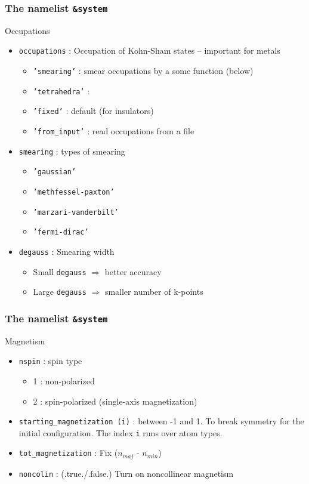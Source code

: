 \documentclass[]{beamer}
\def\t#1{{\texttt{#1}}}
\begin{document}
\begin{frame}
  \frametitle{The namelist \t{\&system}}
  \begin{block}{Occupations}
    \begin{itemize}
    \item<1-> \t{occupations} : Occupation of Kohn-Sham states -- important
    for metals
      \begin{itemize}
        \item[]\t{'smearing'} : smear occupations by a some function (below)
        \item[]\t{'tetrahedra'} : 
        \item[]\t{'fixed'} : default (for insulators)
        \item[]\t{'from\_input'} : read occupations from a file
      \end{itemize}
    \item<2-> \t{smearing} : types of smearing
      \begin{itemize}
      \item[]\t{'gaussian'}
      \item[]\t{'methfessel-paxton'} 
      \item[]\t{'marzari-vanderbilt'}
      \item[]\t{'fermi-dirac'}
      \end{itemize}
    \item<3-> \t{degauss} : Smearing width 
      \begin{itemize}
      \item[] Small \t{degauss} $\Rightarrow$ better accuracy
      \item[] Large \t{degauss} $\Rightarrow$ smaller number of k-points
      \end{itemize}
    \end{itemize}
  \end{block}
\end{frame}

\begin{frame}
  \frametitle{The namelist \t{\&system}}
  \begin{block}{Magnetism}
    \begin{itemize}
      \item<1-> \t{nspin} : spin type
        \begin{itemize}
          \item[]1 : non-polarized
          \item[]2 : spin-polarized (single-axis magnetization)
        \end{itemize}
      \item<2-> \t{starting\_magnetization (i)} : between -1 and 1. To break
        symmetry for the initial configuration. The index \t{i} runs over
        atom types.
      \item<3-> \t{tot\_magnetization} : Fix ($n_{maj}$ - $n_{min}$) 
      \item<4-> \t{noncolin} : (.true./.false.) Turn on noncollinear
      magnetism
    \end{itemize}
  \end{block}
\end{frame}
\end{document}
